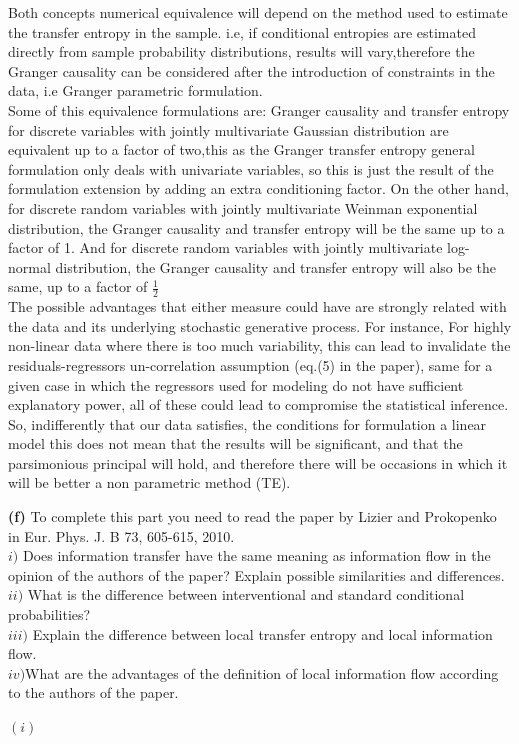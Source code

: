 \documentclass[11pt]{article}
\begin{document}
Both concepts numerical equivalence will depend on the method used to estimate the transfer entropy in the sample. i.e, if conditional entropies are estimated directly from sample probability distributions, results will vary,therefore the Granger causality can be considered after the introduction of constraints in the data, i.e Granger parametric formulation.  \\

Some of this equivalence formulations are:
Granger causality and transfer entropy for discrete variables with jointly multivariate Gaussian distribution are equivalent up to a factor of two,this as the Granger transfer entropy general formulation only deals with univariate variables, so this is just the result of the formulation extension by adding an extra conditioning factor. On the other hand, for discrete random variables with jointly multivariate Weinman exponential distribution, the Granger causality and transfer entropy will be the same up to a factor of 1. And for discrete random variables with jointly multivariate log-normal distribution, the Granger causality and transfer entropy will also be the same, up to a factor of $\frac{1}{2}$\\

The possible advantages that either measure could have are strongly related with the data and its underlying stochastic generative process. For instance, For highly non-linear data where there is too much variability, this can lead to invalidate the residuals-regressors un-correlation assumption (eq.(5) in the paper), same for a given case in which the regressors used for modeling do not have sufficient explanatory power, all of these could lead to compromise the statistical inference. So, indifferently that our data satisfies, the conditions for formulation a linear model this does not mean that the results will be significant, and that the parsimonious principal will hold, and therefore there will be occasions in which it will be better a non parametric  method (TE). \\


\begin{tcolorbox}
\textbf{(f)}
To complete this part you need to read the paper by Lizier and Prokopenko in Eur. Phys. J. B 73, 605-615, 2010.\\
$i)$  Does information transfer have the same meaning as information flow in the opinion of the authors of the paper? Explain possible similarities and differences.\\
$ii)$ What is the difference between interventional and standard
conditional probabilities?\\
$iii)$ Explain the difference between local transfer entropy and local information flow.\\
$iv)$What are the advantages of the definition of local information flow according to the authors of the paper.\\
\end{tcolorbox}
$(i)$\\
\end{document}

